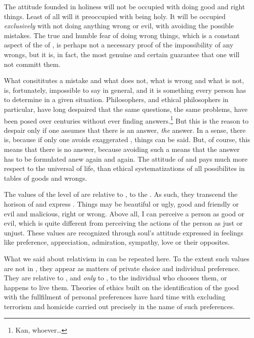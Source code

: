 {\pa The attitude founded in holiness will not be occupied with doing
good and right things.  Least of all will it preoccupied with being
holy.  It will be occupied {\em exclusively} with not doing anything
wrong or evil, with avoiding the possible mistakes.  The true and
humble fear of doing wrong things, which is a constant aspect of the
 of , is perhaps not a necessary proof
of the impossibility of any wrongs, but it is, in fact, the most
genuine and certain guarantee that one will not committ them.

\pa What  consititutes a mistake and what does not, what
 is wrong and what is not, is, fortunately, impossible
to say in general, and it is something every person has to determine
in a given situation.  Philosophers, and ethical philosophers in
particular, have long despaired that the same questions, the same
problems, have been posed over centuries without ever finding
answers.\footnote{ Kan, whoever\ldots} But this is the reason to despair
only if one assumes that there is an answer, {\em the} answer.  In a
sense, there is, because if only one avoids exaggerated
, things can be said.  But, of course, this means that
there is no answer, because avoiding such a  means that
the answer has to be formulated anew again and again.  The attitude of
 and  pays much more respect to the universal
 of life, than ethical systematizations of
all possibilites in tables of goods and wrongs.

\pa\mine The values of the level of  are relative to
, to the .  As such, they transcend the horison of
 and express .  Things may be
beautiful or ugly, good and friendly or evil and malicious, right or
wrong.  Above all, I can perceive a person as good or evil, which is
quite different from perceiving the actions of the person as just or
unjust.  These values are recognized through soul's attitude expressed
in feelings like preference, appreciation, admiration, sympathy, love
or their opposites.  

\subpa What we said about relativism in  can be
repeated here.  To the extent such values are not  in
, they appear as matters of private choice and individual
preference.  They are relative to , and {\em only} to
, to the individual who chooses them, or happens to live
them. Theories of ethics built on the identification of the good with 
the fullfilment of personal preferences have hard time with excluding 
terrorism and homicide carried out precisely in the name of such 
preferences.

}
